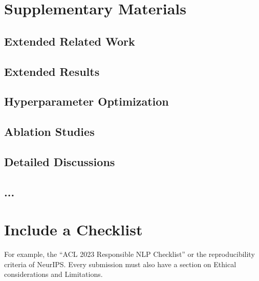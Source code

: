 \documentclass[sigconf, review, nonacm]{acmart}
\begin{document}




\newpage

\appendix

\section{Supplementary Materials}
\label{appendix:supplementarymaterials}


\subsection{Extended Related Work}
\label{appendix:extendedrelatedwork}

\subsection{Extended Results}
\label{appendix:extendedresults}

\subsection{Hyperparameter Optimization}
\label{appendix:hyperparameteroptimization}

\subsection{Ablation Studies}
\label{appendix:ablationstudies}

\subsection{Detailed Discussions}
\label{appendix:detaileddiscussion}

\subsection{...}




\section{Include a Checklist}


For example, the ``ACL 2023 Responsible NLP Checklist'' or the reproducibility criteria of NeurIPS.
Every submission must also have a section on Ethical considerations and Limitations.
\end{document}
